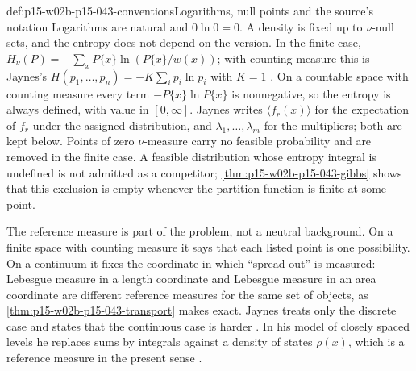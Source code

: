\begin{hbconvention}{def:p15-w02b-p15-043-conventions}{Logarithms, null points and the source's notation}
Logarithms are natural and \(0\ln0=0\). A density is fixed up to
\(\nu\)-null sets, and the entropy does not depend on the version.
In the finite case, \(H_\nu(P)=-\sum_xP\{x\}\ln(P\{x\}/w(x))\); with
counting measure this is Jaynes's
\(H(p_1,\ldots,p_n)=-K\sum_ip_i\ln p_i\) with \(K=1\)
\cite[p.~622, eq.~(2-3); p.~623, after eq.~(2-13)]{Jaynes1957InformationTheory}.
On a countable space with counting measure every term \(-P\{x\}\ln P\{x\}\)
is nonnegative, so the entropy is always defined, with value in \([0,\infty]\).
Jaynes writes \(\langle f_r(x)\rangle\) for the expectation of \(f_r\) under the
assigned distribution, and \(\lambda_1,\ldots,\lambda_m\) for the multipliers;
both are kept below. Points of zero \(\nu\)-measure carry no feasible
probability and are removed in the finite case. A feasible distribution whose
entropy integral is undefined is not admitted as a competitor;
\cref{thm:p15-w02b-p15-043-gibbs} shows that this exclusion is empty
whenever the partition function is finite at some point.
\end{hbconvention}

The reference measure is part of the problem, not a neutral background.
On a finite space with counting measure it says that each listed point is
one possibility. On a continuum it fixes the coordinate in which ``spread
out'' is measured: Lebesgue measure in a length coordinate and Lebesgue
measure in an area coordinate are different reference measures for the same
set of objects, as \cref{thm:p15-w02b-p15-043-transport} makes exact.
Jaynes treats only the discrete case and states that the continuous case
is harder \cite[p.~622, n.~6]{Jaynes1957InformationTheory}. In his model of
closely spaced levels he replaces sums by integrals against a density of
states \(\rho(x)\), which is a reference measure in the present sense
\cite[p.~625]{Jaynes1957InformationTheory}.

